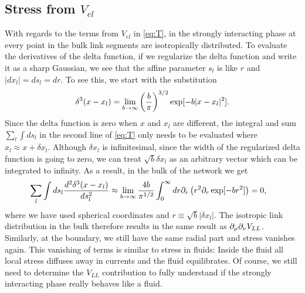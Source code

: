 \documentclass[endfloats,nofootinbib,preprint,floatfix,titlepage,superscriptaddress,linenumbers]{revtex4-1} %
\begin{document}
\subsection{Stress from $V_{el}$}
With regards to the terms from $V_{el}$ in \eqref{eq:T}, in the strongly interacting phase at every point in the bulk link segments are isotropically distributed. 
To evaluate the derivatives of the delta function, if we regularize the delta function and write it as a sharp Gaussian, we see that the affine parameter $s_l$ is like $r$ and $|dx_l|= ds_l = dr$. 
To see this, we start with the substitution
\[\delta^3(x-x_l) = \lim_{b\to \infty } \left({b \over\pi}\right)^{3/2} \exp[-b|x-x_l|^2].\]
Since the delta function is zero when $x$ and $x_l$ are different, the integral and sum $\sum_l\int ds_l$ in the second line of \eqref{eq:T} only needs to be evaluated where $x_l \approx x+\delta x_l $. 
Although $\delta x_l$ is infinitesimal, since the width of the regularized delta function is going to zero, we can treat $\sqrt{b}\delta x_l$ as an arbitrary vector which can be integrated to infinity. 
As a result, in the bulk of the network we get 
\begin{align}\sum_l\int ds_l {d^2 \delta^3(x-x_l)\over ds_l^2} & \approx 
    \lim_{b\to \infty } {4b \over \pi^{1/2}} \int_0^\infty d r {\partial_r} \left(r^2 \partial_r \exp[-br^2]\right) = 0, 
\end{align}
where we have used spherical coordinates and $r \equiv \sqrt{b} | \delta x_l| $.
The isotropic link distribution in the bulk therefore results in the same result as $  \partial_\mu \partial_\nu V_{LL}$.
Similarly, at the boundary, we still have the same radial part and stress vanishes again. 
This vanishing of terms is similar to stress in fluids: Inside the fluid all local stress diffuses away in currents and the fluid equilibrates. 
Of course, we still need to determine the $V_{LL}$ contribution to fully understand if the strongly interacting phase really behaves like a fluid. 
\end{document}
